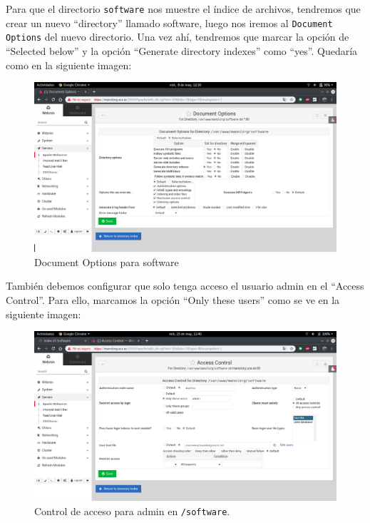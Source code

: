\documentclass[12pt,letterpaper]{article}
\begin{document}
\begin{itemize}
	Para que el directorio \texttt{software} nos muestre el índice de archivos, tendremos que crear un nuevo ``directory'' llamado software, luego nos iremos al \texttt{Document Options} del nuevo directorio. Una vez ahí, tendremos que marcar la opción de ``Selected below'' y la opción ``Generate directory indexes'' como ``yes''. Quedaría como en la siguiente imagen:
	\newpage
	\begin{figure}[h]
		\centering
		\includegraphics[scale=0.34]{Indexing.png}
		\caption{Document Options para software}
		\label{Document Options para software}
	\end{figure}

	También debemos configurar que solo tenga acceso el usuario admin en el ``Access Control''. Para ello, marcamos la opción ``Only these users'' como se ve en la siguiente imagen:
	\newpage
	\begin{figure}[h]
		\centering
		\includegraphics[scale=0.34]{Admin.png}
		\caption{Control de acceso para admin en \texttt{/software}.}
		\label{Control de acceso para admin en /software}
	\end{figure}
	

\end{itemize}
\end{document}
